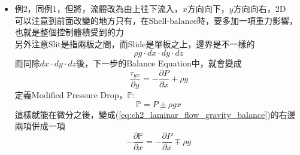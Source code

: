 \documentclass[../main.tex]{subfiles}
\begin{document}
\begin{itemize}
\begin{enumerate}
\begin{equation}
      \end{equation}
      也可以看出，Fanning Friction Factor和雷諾數成反比關係\\
      其中$\tau_w$為壁面剪應力，此題為$\tau_{yx}|_{y=B}$
      \begin{equation}
        f_F = \frac{\tau_{yx}|_{y=B}}{\frac{1}{2}\rho \left<u_x\right>^2}
      \end{equation}
      由於Fanning Friction Factor 通常是用來看出與$\text{Re}$的關係\\
      最後要換成以雷諾數表示，不需要把速度換回去
      \begin{align}
        f_F &= \frac{\left(
          -\frac{\partial P}{\partial x}
        \right)B}{\frac{1}{2}\rho\left<u_x\right>\cdot\frac{B^2}{3\mu}\left(-\frac{\partial P}{\partial x}\right)} \nonumber\\
        &= \frac{6\mu}{\rho\left<u_x\right>B} \nonumber\\
        &= \frac{24\mu}{\rho\left<u_x\right>4B}
      \end{align}
      得到Fanning Friction Factor 與雷諾數的關係
      \begin{equation}
        \boxed{f_F = \frac{24}{\text{Re}}}
      \end{equation}
  \end{enumerate}
  \item 例2，同例1，但將，流體改為由上往下流入，$x$方向向下，$y$方向向右，2D\\
    可以注意到前面改變的地方只有，在Shell-balance時，要多加一項重力影響，也就是整個控制體積受到的力\\
    另外注意Slit是指兩板之間，而Slide是單板之上，邊界是不一樣的
    \begin{equation}
      \rho g \cdot dx\cdot dy\cdot dz
    \end{equation}
    而同除$dx\cdot dy\cdot dz$後，下一步的Balance Equation中，就會變成
    \begin{equation}
      \frac{\tau_{yx}}{\partial y} = -\frac{\partial P}{\partial x} + \rho g \label{eq:ch2_laminar_flow_gravity_balance}
    \end{equation}
    定義Modified Pressure Drop，$\mathbb{P}$:
    \begin{equation}
      \boxed{\mathbb{P} = P \pm \rho g x}
    \end{equation}
    這樣就能在微分之後，變成(\ref{eq:ch2_laminar_flow_gravity_balance})的右邊兩項併成一項
    \begin{equation}
      -\frac{\partial \mathbb{P}}{\partial x} = -\frac{\partial P}{\partial x} \mp \rho g 

\end{equation}
\end{itemize}
\end{document}
